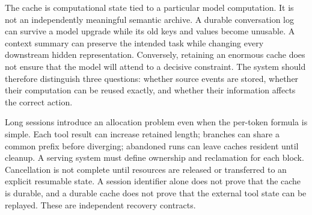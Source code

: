 The cache is computational state tied to a particular model computation. It is not an independently meaningful semantic archive. A durable conversation log can survive a model upgrade while its old keys and values become unusable. A context summary can preserve the intended task while changing every downstream hidden representation. Conversely, retaining an enormous cache does not ensure that the model will attend to a decisive constraint. The system should therefore distinguish three questions: whether source events are stored, whether their computation can be reused exactly, and whether their information affects the correct action.

Long sessions introduce an allocation problem even when the per-token formula is simple. Each tool result can increase retained length; branches can share a common prefix before diverging; abandoned runs can leave caches resident until cleanup. A serving system must define ownership and reclamation for each block. Cancellation is not complete until resources are released or transferred to an explicit resumable state. A session identifier alone does not prove that the cache is durable, and a durable cache does not prove that the external tool state can be replayed. These are independent recovery contracts.
